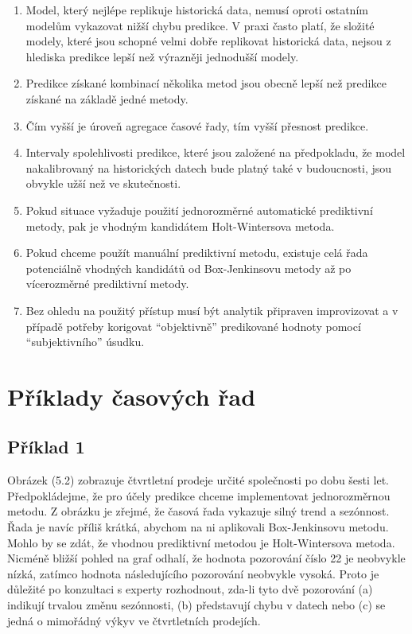 \begin{enumerate}
\item Model, který nejlépe replikuje historická data, nemusí oproti ostatním modelům vykazovat nižší chybu predikce. V praxi často platí, že složité modely, které jsou schopné velmi dobře replikovat historická data, nejsou z hlediska predikce lepší než výrazněji jednodušší modely.
\item Predikce získané kombinací několika metod jsou obecně lepší než predikce získané na základě jedné metody.
\item Čím vyšší je úroveň agregace časové řady, tím vyšší přesnost predikce.
\item Intervaly spolehlivosti predikce, které jsou založené na předpokladu, že model nakalibrovaný na historických datech bude platný také v budoucnosti, jsou obvykle užší než ve skutečnosti.
\item Pokud situace vyžaduje použití jednorozměrné automatické prediktivní metody, pak je vhodným kandidátem Holt-Wintersova metoda.
\item Pokud chceme použít manuální prediktivní metodu, existuje celá řada potenciálně vhodných kandidátů od Box-Jenkinsovu metody až po vícerozměrné prediktivní metody.
\item Bez ohledu na použitý přístup musí být analytik připraven improvizovat a v případě potřeby korigovat ``objektivně'' predikované hodnoty pomocí ``subjektivního'' úsudku.
\end{enumerate}

\section{Příklady časových řad}

\subsection{Příklad 1}

Obrázek (5.2) zobrazuje čtvrtletní prodeje určité společnosti po dobu šesti let. Předpokládejme, že pro účely predikce chceme implementovat jednorozměrnou metodu. Z obrázku je zřejmé, že časová řada vykazuje silný trend a sezónnost. Řada je navíc příliš krátká, abychom na ni aplikovali Box-Jenkinsovu metodu. Mohlo by se zdát, že vhodnou prediktivní metodou je Holt-Wintersova metoda. Nicméně bližší pohled na graf odhalí, že hodnota pozorování číslo 22 je neobvykle nízká, zatímco hodnota následujícího pozorování neobvykle vysoká. Proto je důležité po konzultaci s experty rozhodnout, zda-li tyto dvě pozorování (a) indikují trvalou změnu sezónnosti, (b) představují chybu v datech nebo (c) se jedná o mimořádný výkyv ve čtvrtletních prodejích.

